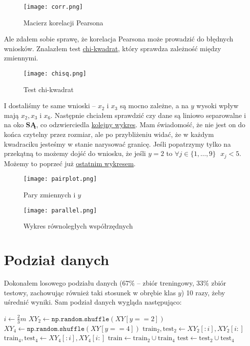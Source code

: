 \documentclass[a4paper,12pt]{article}
\begin{document}
\begin{figure}[H]
    \centering
    \texttt{[image: corr.png]} 
    \caption{Macierz korelacji Pearsona}
    \label{fig:corr}
\end{figure}

\!\!\!\!\!\!\!\!Ale zdałem sobie sprawę, że korelacja Pearsona może prowadzić do błędnych wniosków. Znalazłem test \hyperref[fig:chisq]{chi-kwadrat}, który sprawdza zależność między zmiennymi.

\begin{figure}[H]
    \centering
    \texttt{[image: chisq.png]}
    \caption{Test chi-kwadrat}
    \label{fig:chisq}
\end{figure}

\!\!\!\!\!\!\!\!I dostaliśmy te same wnioski -- $x_2$ i $x_3$ są mocno zależne, a na $y$ wysoki wpływ mają $x_2, x_3$ i $x_6$. Następnie chciałem sprawdzić czy dane są liniowo separowalne i na oko \textbf{SĄ}, co odzwierciedla \hyperref[fig:pair]{kolejny wykres}. Mam świadomość, że nie jest on do końca czytelny przez rozmiar, ale po przybliżeniu widać, że w każdym kwadraciku jesteśmy w stanie narysować granicę. Jeśli popatrzymy tylko na przekątną to możemy dojść do wniosku, że  jeśli $y=2$ to $\forall j \in \{1,\dots,9\} \text{ } x_j<5$. Możemy to poprzeć już \hyperref[fig:parallel]{ostatnim wykresem}.

\begin{figure}
    \centering
    \texttt{[image: pairplot.png]}
    \caption{Pary zmiennych i $y$}
    \label{fig:pair}
\end{figure}

\begin{figure}[H]
    \centering
    \texttt{[image: parallel.png]}
    \caption{Wykres równoległych współrzędnych}
    \label{fig:parallel}
\end{figure}

\section{Podział danych}
Dokonałem losowego podziału danych (67\% -- zbiór treningowy, 33\% zbiór testowy, zachowując również taki stosunek w obrębie klas $y$) 10 razy, żeby uśrednić wyniki.
Sam podział danych wygląda następująco:
\begin{algorithmic}[1]
\State $i \gets \frac{2}{3}m$
\State $XY_2 \gets \texttt{np.random.shuffle}(XY[y == 2])$
\State $XY_4 \gets \texttt{np.random.shuffle}(XY[y == 4])$
\State $\mathrm{train}_2, \mathrm{test}_2 \gets XY_2[:i], XY_2[i:]$
\State $\mathrm{train}_4, \mathrm{test}_4 \gets XY_4[:i], XY_4[i:]$
\State $\mathrm{train} \gets \mathrm{train}_2 \cup \mathrm{train}_4$
\State $\mathrm{test} \gets \mathrm{test}_2 \cup \mathrm{test}_4$
\end{algorithmic}
\end{document}
